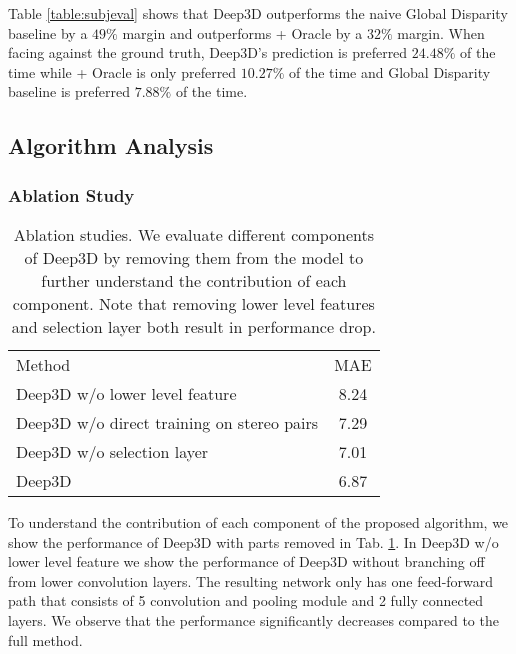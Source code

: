 \documentclass[runningheads]{llncs}
\begin{document}
Table \ref{table:subjeval} shows that Deep3D outperforms the naive Global Disparity baseline by a $49\%$ margin and outperforms \cite{eigen2014depth} + Oracle by a $32\%$ margin. 
When facing against the ground truth, Deep3D's prediction is preferred $24.48\%$ of the time while \cite{eigen2014depth} + Oracle is only preferred $10.27\%$ of the time and Global Disparity baseline is preferred $7.88\%$ of the time.

\subsection{Algorithm Analysis}\subsubsection{Ablation Study}\label{sec:ablation}\begin{table}[!ht]
\begin{center}
\caption{Ablation studies. We evaluate different components of Deep3D by removing them from the model to further understand the contribution of each component. Note that removing lower level features and selection layer both result in performance drop.}
\label{table:ablation}
\begin{tabular}{lc}
\hline\noalign{\smallskip}
Method & MAE\\
\noalign{\smallskip}
\hline
\noalign{\smallskip}
Deep3D w/o lower level feature              & 8.24\\
Deep3D w/o direct training on stereo pairs \hspace{0.5in}  & 7.29\\
Deep3D w/o selection layer                  & 7.01\\
Deep3D                                      & 6.87\\
\hline
\end{tabular}
\end{center}
\end{table}

To understand the contribution of each component of the proposed algorithm, we show the performance of Deep3D with parts removed in Tab. \ref{table:ablation}.
In Deep3D w/o lower level feature we show the performance of Deep3D without branching off from lower convolution layers.
The resulting network only has one feed-forward path that consists of 5 convolution and pooling module and 2 fully connected layers.
We observe that the performance significantly decreases compared to the full method.
\end{document}
